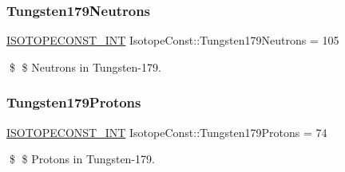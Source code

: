 \subsubsection{\texorpdfstring{Tungsten179\+Neutrons}{Tungsten179Neutrons}}
{\footnotesize\ttfamily \mbox{\hyperlink{group___isotope_const-_macros_ga5f18360b3e99483a35c32d789e62621c}{I\+S\+O\+T\+O\+P\+E\+C\+O\+N\+S\+T\+\_\+\+I\+NT}} Isotope\+Const\+::\+Tungsten179\+Neutrons = 105}

\$ \$ Neutrons in Tungsten-\/179. \mbox{\label{group___isotope_const-_tungsten-_w179_ga15c26a5f9ffa1034252a5a999f022f32}} 
\subsubsection{\texorpdfstring{Tungsten179\+Protons}{Tungsten179Protons}}
{\footnotesize\ttfamily \mbox{\hyperlink{group___isotope_const-_macros_ga5f18360b3e99483a35c32d789e62621c}{I\+S\+O\+T\+O\+P\+E\+C\+O\+N\+S\+T\+\_\+\+I\+NT}} Isotope\+Const\+::\+Tungsten179\+Protons = 74}

\$ \$ Protons in Tungsten-\/179. 